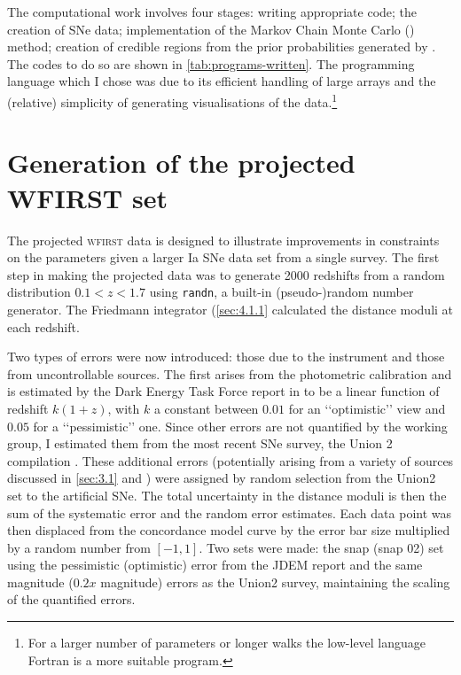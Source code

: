The computational work involves four stages: writing appropriate code; the creation of SNe data; implementation of the Markov Chain Monte Carlo (\mcmc{}) method; creation of credible regions from the prior probabilities generated by \mcmc{}. The codes to do so are shown in \cref{tab:programs-written}. The programming language which I chose was \matlab{} due to its efficient handling of large arrays and the (relative) simplicity of generating visualisations of the data.\footnote{For a larger number of parameters or longer walks the low-level language Fortran is a more suitable program.}





\section{Generation of the projected WFIRST set}
\label{sec:4.2}

The projected \textsc{wfirst} data is designed to illustrate improvements in constraints on the parameters given a larger Ia SNe data set from a single survey. The first step in making the projected data was to generate 2000 redshifts from a random distribution $0.1 < z < 1.7$ using \texttt{randn}, a built-in \matlab{} (pseudo-)random number generator. The Friedmann integrator (\cref{sec:4.1.1} calculated the distance moduli at each redshift. 

Two types of errors were now introduced: those due to the instrument and those from uncontrollable sources. The first arises from the photometric calibration and is estimated by the Dark Energy Task Force report in \cite{Albrecht2006} to be a linear function of redshift $k(1 + z)$, with $k$ a constant between $0.01$ for an \lq\lq{}optimistic\rq\rq{} view and $0.05$ for a \lq\lq{}pessimistic\rq\rq{} one. Since other errors are not quantified by the working group, I estimated them from the most recent SNe survey, the Union 2 compilation \cite{Amanullah2010}. These additional errors (potentially arising from a variety of sources discussed in \cref{sec:3.1} and \cite{Leibundgut2009,Lidman2010b}) were assigned by random selection from the Union2 set to the artificial SNe. The total uncertainty in the distance moduli is then the sum of the systematic error and the random error estimates. Each data point was then displaced from the concordance model curve by the error bar size multiplied by a random number from $[-1, 1]$. Two sets were made: the snap (snap 02) set using the pessimistic (optimistic) error from the JDEM report and the same magnitude ($0.2x$ magnitude) errors as the Union2 survey, maintaining the scaling of the quantified errors.



